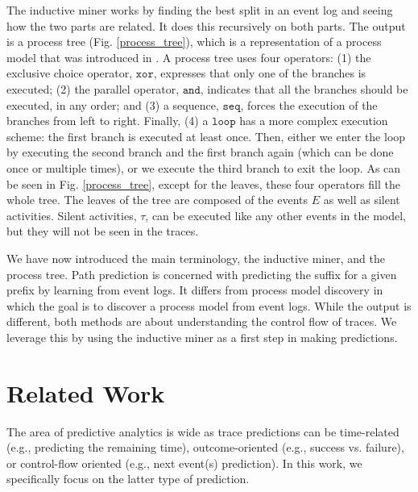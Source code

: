 \documentclass[runningheads]{llncs}
\begin{document}
The inductive miner works by finding the best split in an event log and seeing how the two parts are related. It does this recursively on both parts. The output is a process tree (Fig. \ref{process_tree}), which is a representation of a process model that was introduced in \cite{vanhatalo2008refined}. A process tree uses four operators: (1) the exclusive choice operator, $\texttt{xor}$, expresses that only one of the branches is executed; (2) the parallel operator, $\texttt{and}$, indicates that all the branches should be executed, in any order; and (3) a sequence, $\texttt{seq}$, forces the execution of the branches from left to right. Finally, (4) a $\texttt{loop}$ has a more complex execution scheme: the first branch is executed at least once. Then, either we enter the loop by executing the second branch and the first branch again (which can be done once or multiple times), or we execute the third branch to exit the loop. As can be seen in Fig. \ref{process_tree}, except for the leaves, these four operators fill the whole tree. The leaves of the tree are composed of the events $E$ as well as silent activities. Silent activities, $\tau$, can be executed like any other events in the model, but they will not be seen in the traces.

We have now introduced the main terminology, the inductive miner, and the process tree. Path prediction is concerned with predicting the suffix for a given prefix by learning from event logs. It differs from process model discovery in which the goal is to discover a process model from event logs. While the output is different, both methods are about understanding the control flow of traces. We leverage this by using the inductive miner as a first step in making predictions.


\section{Related Work}

The area of predictive analytics is wide as trace predictions can be time-related (e.g., predicting the remaining time), outcome-oriented (e.g., success vs. failure), or control-flow oriented (e.g., next event(s) prediction). In this work, we specifically focus on the latter type of prediction. 
\end{document}
